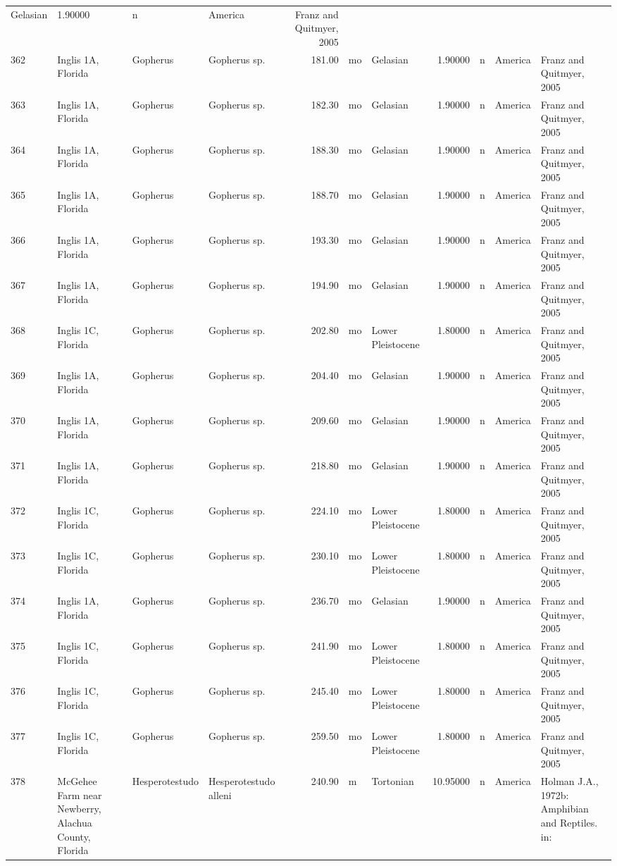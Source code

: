 \documentclass[]{article}
\begin{document}
\begin{longtable}[]{@{}llllrllrlll@{}}
Gelasian & 1.90000 & n & America & Franz and Quitmyer,
2005\tabularnewline
362 & Inglis 1A, Florida & Gopherus & Gopherus sp. & 181.00 & mo &
Gelasian & 1.90000 & n & America & Franz and Quitmyer,
2005\tabularnewline
363 & Inglis 1A, Florida & Gopherus & Gopherus sp. & 182.30 & mo &
Gelasian & 1.90000 & n & America & Franz and Quitmyer,
2005\tabularnewline
364 & Inglis 1A, Florida & Gopherus & Gopherus sp. & 188.30 & mo &
Gelasian & 1.90000 & n & America & Franz and Quitmyer,
2005\tabularnewline
365 & Inglis 1A, Florida & Gopherus & Gopherus sp. & 188.70 & mo &
Gelasian & 1.90000 & n & America & Franz and Quitmyer,
2005\tabularnewline
366 & Inglis 1A, Florida & Gopherus & Gopherus sp. & 193.30 & mo &
Gelasian & 1.90000 & n & America & Franz and Quitmyer,
2005\tabularnewline
367 & Inglis 1A, Florida & Gopherus & Gopherus sp. & 194.90 & mo &
Gelasian & 1.90000 & n & America & Franz and Quitmyer,
2005\tabularnewline
368 & Inglis 1C, Florida & Gopherus & Gopherus sp. & 202.80 & mo & Lower
Pleistocene & 1.80000 & n & America & Franz and Quitmyer,
2005\tabularnewline
369 & Inglis 1A, Florida & Gopherus & Gopherus sp. & 204.40 & mo &
Gelasian & 1.90000 & n & America & Franz and Quitmyer,
2005\tabularnewline
370 & Inglis 1A, Florida & Gopherus & Gopherus sp. & 209.60 & mo &
Gelasian & 1.90000 & n & America & Franz and Quitmyer,
2005\tabularnewline
371 & Inglis 1A, Florida & Gopherus & Gopherus sp. & 218.80 & mo &
Gelasian & 1.90000 & n & America & Franz and Quitmyer,
2005\tabularnewline
372 & Inglis 1C, Florida & Gopherus & Gopherus sp. & 224.10 & mo & Lower
Pleistocene & 1.80000 & n & America & Franz and Quitmyer,
2005\tabularnewline
373 & Inglis 1C, Florida & Gopherus & Gopherus sp. & 230.10 & mo & Lower
Pleistocene & 1.80000 & n & America & Franz and Quitmyer,
2005\tabularnewline
374 & Inglis 1A, Florida & Gopherus & Gopherus sp. & 236.70 & mo &
Gelasian & 1.90000 & n & America & Franz and Quitmyer,
2005\tabularnewline
375 & Inglis 1C, Florida & Gopherus & Gopherus sp. & 241.90 & mo & Lower
Pleistocene & 1.80000 & n & America & Franz and Quitmyer,
2005\tabularnewline
376 & Inglis 1C, Florida & Gopherus & Gopherus sp. & 245.40 & mo & Lower
Pleistocene & 1.80000 & n & America & Franz and Quitmyer,
2005\tabularnewline
377 & Inglis 1C, Florida & Gopherus & Gopherus sp. & 259.50 & mo & Lower
Pleistocene & 1.80000 & n & America & Franz and Quitmyer,
2005\tabularnewline
378 & McGehee Farm near Newberry, Alachua County, Florida &
Hesperotestudo & Hesperotestudo alleni & 240.90 & m & Tortonian &
10.95000 & n & America & Holman J.A., 1972b: Amphibian and Reptiles. in:

\end{longtable}
\end{document}
